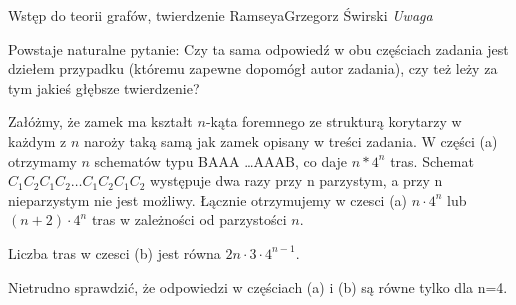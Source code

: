 \begin{referat}{Wstęp do teorii grafów, twierdzenie Ramseya}{Grzegorz Świrski}
\textit{Uwaga}

Powstaje naturalne pytanie: Czy ta sama odpowiedź w obu częściach zadania
jest dziełem przypadku (któremu zapewne dopomógł autor zadania),
czy też leży za tym jakieś głębsze twierdzenie?

Załóżmy, że zamek ma kształt $n$-kąta foremnego ze strukturą korytarzy
w każdym z $n$ naroży taką samą jak zamek opisany w treści zadania. W części
(a) otrzymamy $n$ schematów typu BAAA \ldots AAAB, co daje $n*4^n$ tras. Schemat
$C_1C_2C_1C_2 \ldots C_1C_2C_1C_2$ występuje dwa razy przy n parzystym, a przy
n nieparzystym nie jest możliwy. Łącznie otrzymujemy w czesci (a) $n\cdot4^n$ lub $(n+2)\cdot4^n$ tras w zależności od parzystości $n$.

Liczba tras w czesci (b) jest równa $2n \cdot 3 \cdot 4^{n-1}$.

Nietrudno sprawdzić, że odpowiedzi w częściach (a) i (b) są równe tylko
dla n=4.

\end{referat}

